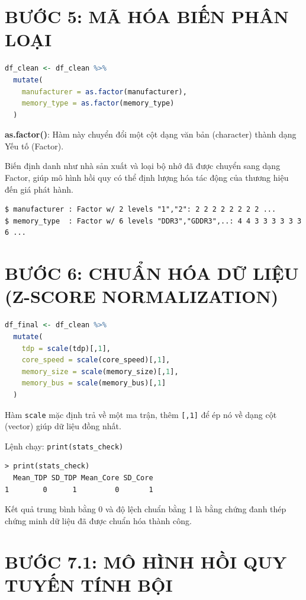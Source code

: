 \documentclass[12pt,a4paper]{article}
\begin{document}
\section*{BƯỚC 5: MÃ HÓA BIẾN PHÂN LOẠI}

\begin{lstlisting}[language=R]
df_clean <- df_clean %>%
  mutate(
    manufacturer = as.factor(manufacturer),
    memory_type = as.factor(memory_type)
  )
\end{lstlisting}

\textbf{as.factor()}: Hàm này chuyển đổi một cột dạng văn bản (character) thành dạng Yếu tố (Factor).

Biến định danh như nhà sản xuất và loại bộ nhớ đã được chuyển sang dạng Factor, giúp mô hình hồi quy có thể định lượng hóa tác động của thương hiệu đến giá phát hành.


\begin{lstlisting}[style=console]
$ manufacturer : Factor w/ 2 levels "1","2": 2 2 2 2 2 2 2 2 ...
$ memory_type  : Factor w/ 6 levels "DDR3","GDDR3",..: 4 4 3 3 3 3 3 3 6 ...
\end{lstlisting}

\section*{BƯỚC 6: CHUẨN HÓA DỮ LIỆU (Z-SCORE NORMALIZATION)}

\begin{lstlisting}[language=R]
df_final <- df_clean %>%
  mutate(
    tdp = scale(tdp)[,1],
    core_speed = scale(core_speed)[,1],
    memory_size = scale(memory_size)[,1],
    memory_bus = scale(memory_bus)[,1]
  )
\end{lstlisting}

Hàm \texttt{scale} mặc định trả về một ma trận, thêm \texttt{[,1]} để ép nó về dạng cột (vector) giúp dữ liệu đồng nhất.

Lệnh chạy: \texttt{print(stats\_check)}
\begin{lstlisting}[style=console]
> print(stats_check)
  Mean_TDP SD_TDP Mean_Core SD_Core
1        0      1         0       1
\end{lstlisting}

Kết quả trung bình bằng 0 và độ lệch chuẩn bằng 1 là bằng chứng đanh thép chứng minh dữ liệu đã được chuẩn hóa thành công.

\section*{BƯỚC 7.1: MÔ HÌNH HỒI QUY TUYẾN TÍNH BỘI}
\end{document}
